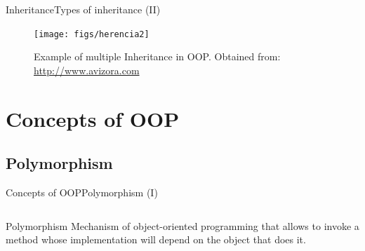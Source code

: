 \documentclass[10pt,compress]{beamer} %
\begin{document}
\begin{frame}{Inheritance}{Types of inheritance (II)}
	\begin{figure}
		\texttt{[image: figs/herencia2]}
		\caption{{\scriptsize Example of multiple Inheritance in OOP. Obtained from: \url{http://www.avizora.com}}}
	\end{figure}
\end{frame}

\section{Concepts of OOP}
\subsection{Polymorphism}

\begin{frame}{Concepts of OOP}{Polymorphism (I)}
    \begin{columns}

	\begin{block}{Polymorphism}
		Mechanism of object-oriented programming that allows to invoke a method whose implementation will depend on the object that does it.
  	\end{block}	




    \end{columns}

\end{frame}
\end{document}
